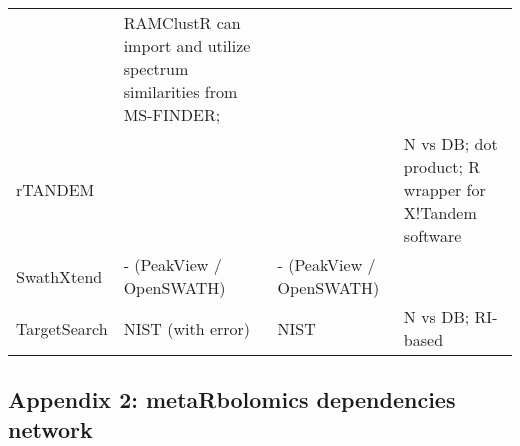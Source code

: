 \documentclass[]{article}
\begin{document}
\begin{longtable}[]{@{}llll@{}}
\begin{minipage}[t]{0.17\columnwidth}
\strut
\end{minipage} & \begin{minipage}[t]{0.46\columnwidth}\raggedright
RAMClustR can import and utilize spectrum similarities from MS-FINDER;\strut
\end{minipage}\tabularnewline
\begin{minipage}[t]{0.09\columnwidth}\raggedright
rTANDEM\strut
\end{minipage} & \begin{minipage}[t]{0.17\columnwidth}\raggedright
\strut
\end{minipage} & \begin{minipage}[t]{0.17\columnwidth}\raggedright
\strut
\end{minipage} & \begin{minipage}[t]{0.46\columnwidth}\raggedright
N vs DB; dot product; R wrapper for X!Tandem software\strut
\end{minipage}\tabularnewline
\begin{minipage}[t]{0.09\columnwidth}\raggedright
SwathXtend\strut
\end{minipage} & \begin{minipage}[t]{0.17\columnwidth}\raggedright
- (PeakView / OpenSWATH)\strut
\end{minipage} & \begin{minipage}[t]{0.17\columnwidth}\raggedright
- (PeakView / OpenSWATH)\strut
\end{minipage} & \begin{minipage}[t]{0.46\columnwidth}\raggedright
\strut
\end{minipage}\tabularnewline
\begin{minipage}[t]{0.09\columnwidth}\raggedright
TargetSearch\strut
\end{minipage} & \begin{minipage}[t]{0.17\columnwidth}\raggedright
NIST (with error)\strut
\end{minipage} & \begin{minipage}[t]{0.17\columnwidth}\raggedright
NIST\strut
\end{minipage} & \begin{minipage}[t]{0.46\columnwidth}\raggedright
N vs DB; RI-based\strut
\end{minipage}\tabularnewline
\bottomrule
\end{longtable}

\newpage

\hypertarget{appendix-2-metarbolomics-dependencies-network}{%
\subsection*{Appendix 2: metaRbolomics dependencies network}\label{appendix-2-metarbolomics-dependencies-network}}
\end{document}
